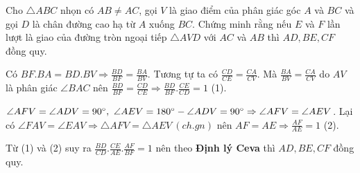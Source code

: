 \begin{prob}[Korea 1997]
	Cho $\triangle ABC$ nhọn có $AB \neq AC$, gọi $V$ là giao điểm của phân giác góc $A$ và $BC$ và gọi $D$ là chân đường cao hạ từ $A$ xuống $BC$. Chứng minh rằng nếu $E$ và $F$ lần lượt là giao của đường tròn ngoại tiếp $\triangle AVD$ với $AC$ và $AB$ thì $AD, BE, CF$ đồng quy.
\end{prob}

\begin{center}

\end{center}

Có $BF.BA = BD.BV \Rightarrow \frac{BD}{BF} = \frac{BA}{BV}$. Tương tự ta có $\frac{CD}{CE} = \frac{CA}{CV}$. Mà $\frac{BA}{BV} = \frac{CA}{CV}$ do $AV$ là phân giác $\angle BAC$ nên $\frac{BD}{BF} = \frac{CD}{CE} \Rightarrow \frac{BD}{BF}.\frac{CE}{CD} = 1$ (1).

$\angle AFV = \angle ADV = 90 \degree,\ \angle AEV = 180 \degree - \angle ADV = 90 \degree \Rightarrow \angle AFV = \angle AEV$. Lại có $\angle FAV = \angle EAV \Rightarrow \triangle AFV = \triangle AEV \ (ch.gn)$ nên $AF = AE \Rightarrow \frac{AF}{AE} = 1$ (2).

Từ (1) và (2) suy ra $\frac{BD}{CD}.\frac{CE}{AE}.\frac{AF}{BF} = 1$ nên theo \textbf{Định lý Ceva} thì $AD, BE, CF$ đồng quy.